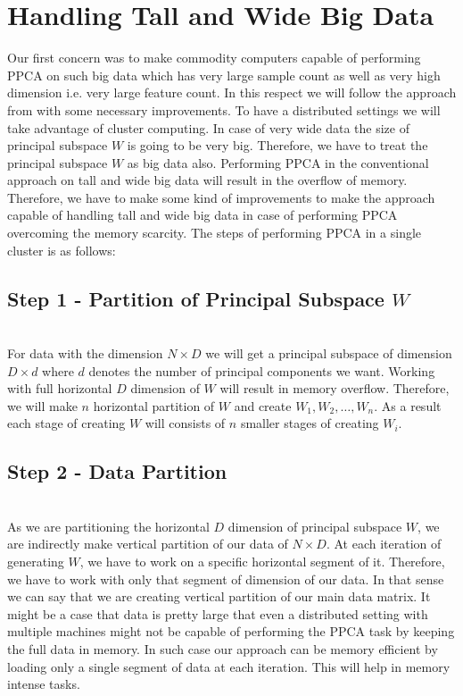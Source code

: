 \documentclass[12pt,notitlepage,oneside]{report}
\begin{document}
\section{Handling Tall and Wide Big Data}
Our first concern was to make commodity computers capable of performing PPCA on such big data which has very large sample count as well as very high dimension i.e. very large feature count. In this respect we will follow the approach from \cite{elgamal} with some necessary improvements. To have a distributed settings we will take advantage of cluster computing. In case of very wide data the size of principal subspace $W$ is going to be very big. Therefore, we have to treat the principal subspace $W$ as big data also. Performing PPCA in the conventional approach on tall and wide big data will result in the overflow of memory. Therefore, we have to make some kind of improvements to make the approach capable of handling tall and wide big data in case of performing PPCA overcoming the memory scarcity. The steps of performing PPCA in a single cluster is as follows:

\subsection{\textbf{Step 1 - Partition of Principal Subspace $W$}}\hspace*{\fill} \\
For data with the dimension $N \times D$ we will get a principal subspace of dimension $D \times d$ where $d$ denotes the number of principal components we want. Working with full horizontal $D$ dimension of $W$ will result in memory overflow. Therefore, we will make $n$ horizontal partition of $W$ and create $W_1, W_2, \dots , W_n$. As a result each stage of creating $W$ will consists of $n$ smaller stages of creating $W_i$. 


\subsection{\textbf{Step 2 - Data Partition}}\hspace*{\fill} \\
As we are partitioning the horizontal $D$ dimension of principal subspace $W$, we are indirectly make vertical partition of our data of $N \times D$. At each iteration of generating $W$, we have to work on a specific horizontal segment of it. Therefore, we have to work with only that segment of dimension of our data. In that sense we can say that we are creating vertical partition of our main data matrix. It might be a case that data is pretty large that even a distributed setting with multiple machines might not be capable of performing the PPCA task by keeping the full data in memory. In such case our approach can be memory efficient by loading only a single segment of data at each iteration. This will help in memory intense tasks.  
\end{document}

